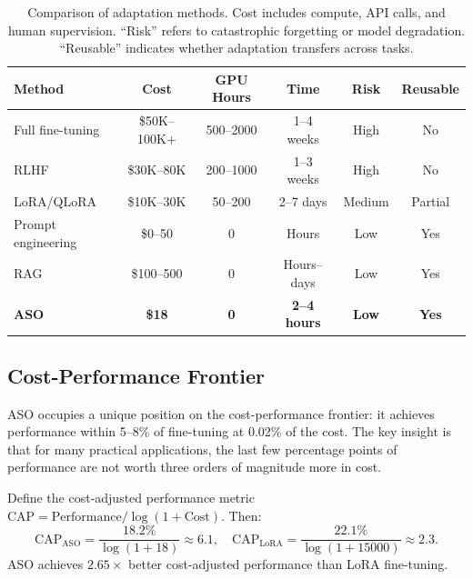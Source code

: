 \begin{table}[H]
\centering
\begin{tabular}{lccccc}
\toprule
Method & Cost & GPU Hours & Time & Risk & Reusable \\
\midrule
Full fine-tuning & \$50K--100K+ & 500--2000 & 1--4 weeks & High & No \\
RLHF & \$30K--80K & 200--1000 & 1--3 weeks & High & No \\
LoRA/QLoRA & \$10K--30K & 50--200 & 2--7 days & Medium & Partial \\
Prompt engineering & \$0--50 & 0 & Hours & Low & Yes \\
RAG & \$100--500 & 0 & Hours--days & Low & Yes \\
\textbf{ASO} & \textbf{\$18} & \textbf{0} & \textbf{2--4 hours} & \textbf{Low} & \textbf{Yes} \\
\bottomrule
\end{tabular}
\caption{Comparison of adaptation methods. Cost includes compute, API calls,
and human supervision. ``Risk'' refers to catastrophic forgetting or model
degradation. ``Reusable'' indicates whether adaptation transfers across tasks.}
\label{tab:cost-comparison}
\end{table}

\subsection{Cost-Performance Frontier}

ASO occupies a unique position on the cost-performance frontier: it achieves
performance within 5--8\% of fine-tuning at 0.02\% of the cost. The key insight
is that for many practical applications, the last few percentage points of
performance are not worth three orders of magnitude more in cost.

\begin{proposition}
Define the cost-adjusted performance metric $\text{CAP} = \text{Performance} / \log(1 + \text{Cost})$. Then:
\begin{equation}
    \text{CAP}_{\text{ASO}} = \frac{18.2\%}{\log(1 + 18)} \approx 6.1,
    \quad
    \text{CAP}_{\text{LoRA}} = \frac{22.1\%}{\log(1 + 15000)} \approx 2.3.
\end{equation}
ASO achieves $2.65\times$ better cost-adjusted performance than LoRA fine-tuning.
\end{proposition}

